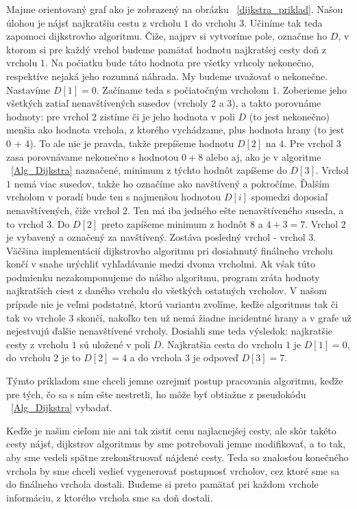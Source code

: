 Majme orientovaný graf ako je zobrazený na obrázku ~\ref{dijkstra_priklad}. Našou úlohou je nájsť najkratšiu cestu z vrcholu $1$ do vrcholu $3$. Učiníme tak teda zapomoci dijkstrovho algoritmu. Čiže, najprv si vytvoríme pole, označme ho $D$, v ktorom si pre každý vrchol budeme pamätať hodnotu najkratšej cesty doň z vrcholu $1$. Na počiatku bude táto hodnota pre všetky vrhcoly nekonečno, respektíve nejaká jeho rozumná náhrada. My budeme uvažovať o nekonečne. Nastavíme $D [1] = 0$. Začíname teda s počiatočným vrcholom $1$. Zoberieme jeho všetkých zatiaľ nenavštívených susedov (vrcholy $2$ a $3$), a takto porovnáme hodnoty: pre vrchol $2$ zistíme či je jeho hodnota v poli $D$ (to jest nekonečno) menšia ako hodnota vrchola, z ktorého vychádzame, plus hodnota hrany (to jest 0 + 4). To ale nie je pravda, takže prepíšeme hodnotu $D [2]$ na $4$. Pre vrchol $3$ zasa porovnávame nekonečno s hodnotou $0+8$ alebo aj, ako je v algoritme ~\ref{Alg_Dijkstra} naznačené, minimum z týchto hodnôt zapíšeme do $D [3]$. Vrchol $1$ nemá viac susedov, takže ho označíme ako navštívený a pokročíme. Ďalším vrcholom v poradí bude ten s najmenšou hodnotou $D [i]$ spomedzi doposiaľ nenavštívených, čiže vrchol $2$. Ten má iba jedného ešte nenavštíveného suseda, a to vrchol $3$. Do $D [2]$ preto zapíšeme minimum z hodnôt $8$ a $4 + 3 = 7$. Vrchol $2$ je vybavený a označený za navštívený. Zostáva posledný vrchol - vrchol $3$. Väčšina implementácií dijkstrovho algoritmu pri dosiahnutý finálneho vrcholu končí v snahe urýchliť vyhľadávanie medzi dvoma vrcholmi. Ak vśak túto podmienku nezakomponujeme do nášho algoritmu, program zráta hodnoty najkratších ciest z daného vrcholu do všetkých ostatných vrcholov. V našom prípade nie je veľmi podstatné, ktorú variantu zvolíme, keďže algoritmus tak či tak vo vrchole $3$ skončí, nakoľko ten už nemá žiadne incidentné hrany a v grafe už nejestvujú ďalšie nenavštívené vrcholy. Dosiahli sme teda výsledok: najkratšie cesty z vrcholu $1$ sú uložené v poli $D$. Najkratšia cesta do vrcholu $1$ je $D [1] = 0$, do vrcholu $2$ je to $D [2] = 4$ a do vrchola $3$ je odpoveď $D [3] = 7$.\newline

Týmto príkladom sme chceli jemne ozrejmiť postup pracovania algoritmu, keďže pre tých, čo sa s ním ešte nestretli, ho môže byť obtiažne z pseudokódu ~\ref{Alg_Dijkstra} vybadať.\newline

Keďže je našim cieľom nie ani tak zistiť cenu najlacnejšej cesty, ale skôr takéto cesty nájsť, dijkstrov algoritmus by sme potrebovali jemne modifikovať, a to tak, aby sme vedeli spätne zrekonštruovať nájdené cesty. Teda so znalosťou konečného vrchola by sme chceli vedieť vygenerovať postupnosť vrcholov, cez ktoré sme sa do finálneho vrchola dostali. Budeme si preto pamätať pri každom vrchole informáciu, z ktorého vrchola sme sa doň dostali.\newline

